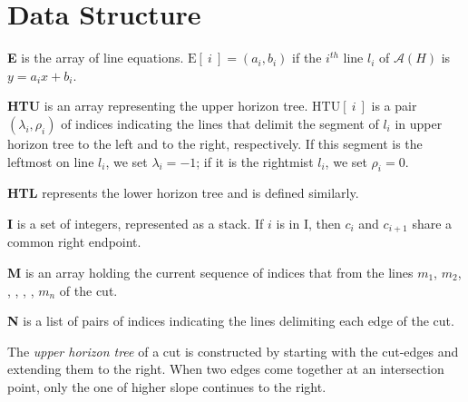 \documentclass[12pt]{article}
\begin{document}
    \section{Data Structure} %
    \label{sec:ds}

        \begin{description}
            \item{\textbf{E\big[1:n\big]}} is the array of line equations. $\text{E}[\ i\ ]=(a_{i}, b_{i})$ if the $i^{th}$ line $l_{i}$ of $\mathscr{A}(H)$ is $y=a_{i}x+b_{i}$.
            
            \item{\textbf{HTU\big[1:n\big]}} is an array representing the upper horizon tree. $\text{HTU}[\ i\ ]$ is a pair $(\lambda_{i}, \rho_{i})$ of indices indicating the lines that delimit the segment of $l_{i}$ in upper horizon tree to the left and to the right, respectively. If this segment is the leftmost on line $l_i$, we set $\lambda_i = -1$; if it is the rightmist $l_i$, we set $\rho_i = 0$.

            \item{\textbf{HTL\big[1:n\big]}} represents the lower horizon tree and is defined similarly.

            \item{\textbf{I}} is a set of integers, represented as a stack. If $i$ is in I, then $c_{i}$ and $c_{i+1}$ share a common right endpoint.
            

            \item{\textbf{M\big[1:n\big]}} is an array holding the current sequence of indices that from the lines $m_{1}$, $m_{2}$,  ,  ,  ,  , $m_{n}$ of the cut.
            
            \item{\textbf{N\big[1:n\big]}} is a list of pairs of indices indicating the lines delimiting each edge of the cut.

        \end{description}


        \pagebreak

        The {\em upper horizon tree} of a cut is constructed by starting with the
        cut-edges and extending them to the right. When two edges come together
        at an intersection point, only the one of higher slope continues to the
        right. 
        
\end{document}
